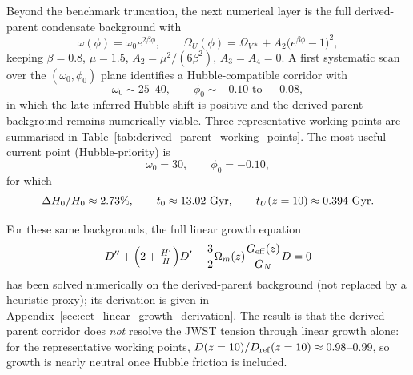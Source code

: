 \documentclass[11pt,a4paper]{article}
\numberwithin{equation}{section}
\begin{document}
Beyond the benchmark truncation, the next numerical layer is the
full derived-parent condensate background with
\[
\omega(\phi)=\omega_0 e^{2\beta\phi},
\qquad
\Omega_U(\phi)=\Omega_{V*}+A_2\bigl(e^{\beta\phi}-1\bigr)^2,
\]
keeping $\beta=0.8$, $\mu=1.5$, $A_2=\mu^2/(6\beta^2)$, $A_3=A_4=0$.
A first systematic scan over the $(\omega_0,\phi_0)$ plane identifies a
Hubble-compatible corridor with
\[
\omega_0\sim 25\text{--}40,
\qquad
\phi_0\sim -0.10\text{ to }-0.08,
\]
in which the late inferred Hubble shift is positive and the
derived-parent background remains numerically viable.
Three representative working points are summarised in
Table~\ref{tab:derived_parent_working_points}.
The most useful current point (Hubble-priority) is
\[
\omega_0=30,\qquad \phi_0=-0.10,
\]
for which
\[
\Delta H_0/H_0\approx 2.73\%,
\qquad
t_0\approx 13.02~{\rm Gyr},
\qquad
t_U(z=10)\approx 0.394~{\rm Gyr}.
\]

For these same backgrounds, the full linear growth equation
\[
D^{\prime\prime}+\Bigl(2+\tfrac{H^{\prime}}{H}\Bigr)D^{\prime}
-\frac{3}{2}\Omega_m(z)\frac{G_{\rm eff}(z)}{G_N}D=0
\]
has been solved numerically on the derived-parent background
(not replaced by a heuristic proxy);
its derivation is given in Appendix~\ref{sec:ect_linear_growth_derivation}.
The result is that the derived-parent corridor does \emph{not} resolve the
JWST tension through linear growth alone: for the representative working
points, $D(z=10)/D_{\rm ref}(z=10)\approx 0.98$--$0.99$,
so growth is nearly neutral once Hubble friction is included.
\end{document}
